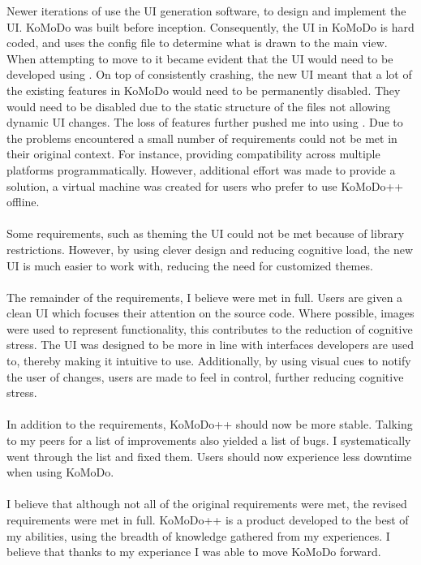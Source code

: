 %
Newer iterations of  use the UI generation software,  to design and implement the UI. KoMoDo was built before  inception. Consequently, the UI in KoMoDo is hard coded, and uses the  config file to determine what is drawn to the main view. When attempting to move to  it became evident that the UI would need to be developed using . On top of  consistently crashing, the new UI meant that a lot of the existing features in KoMoDo would need to be permanently disabled. They would need to be disabled due to the static structure of the  files not allowing dynamic UI changes. The loss of features further pushed me into using .
%
%
%
%
Due to the problems encountered a small number of requirements could not be met in their original context. For instance, providing compatibility across multiple platforms programmatically. However, additional effort was made to provide a solution, a virtual machine was created for users who prefer to use KoMoDo++ offline.\\\\
%
Some requirements, such as theming the UI could not be met because of library restrictions. However, by using clever design and reducing cognitive load, the new UI is much easier to work with, reducing the need for customized themes.\\\\
%
The remainder of the requirements, I believe were met in full. Users are given a clean UI which focuses their attention on the source code. Where possible, images were used to represent functionality, this contributes to the reduction of cognitive stress. The UI was designed to be more in line with interfaces developers are used to, thereby making it intuitive to use. Additionally, by using visual cues to notify the user of changes, users are made to feel in control, further reducing cognitive stress.\\\\
%
In addition to the requirements, KoMoDo++ should now be more stable. Talking to my peers for a list of improvements also yielded a list of bugs. I systematically went through the list and fixed them. Users should now experience less downtime when using KoMoDo.\\\\
%
I believe that although not all of the original requirements were met, the revised requirements were met in full. KoMoDo++ is a product developed to the best of my abilities, using the breadth of knowledge gathered from my experiences. I believe that thanks to my experiance I was able to move KoMoDo forward.
